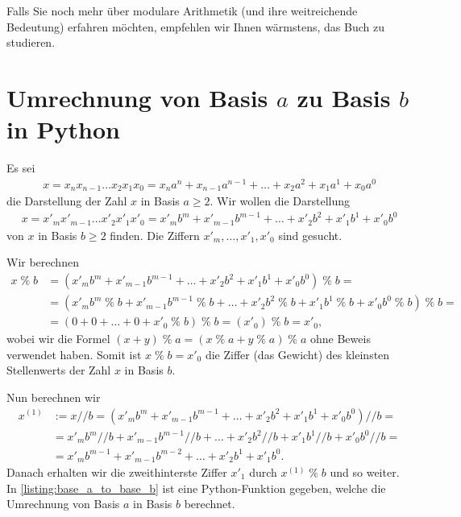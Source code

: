Falls Sie noch mehr über modulare Arithmetik (und ihre weitreichende Bedeutung) erfahren möchten, empfehlen wir Ihnen wärmstens, das Buch \cite{LearningModernAlgebra} zu studieren.


\section{Umrechnung von Basis \texorpdfstring{$a$}{a} zu Basis \texorpdfstring{$b$}{b} in Python}
Es sei
\begin{align*}
	x = x_nx_{n-1}\ldots x_2x_1x_0 = x_na^n + x_{n-1}a^{n-1} + \ldots + x_2a^2 + x_1a^1 + x_0a^0
\end{align*}
die Darstellung der Zahl $x$ in Basis $a\geq 2$. Wir wollen die Darstellung
\begin{align*}
	x = x'_mx'_{m-1}\ldots x'_2x'_1x'_0 = x'_mb^m + x'_{m-1}b^{m-1} + \ldots + x'_2b^2 + x'_1b^1 + x'_0b^0
\end{align*}
von $x$ in Basis $b\geq 2$ finden. Die  Ziffern $x'_m, \ldots, x'_1, x'_0$ sind gesucht.

Wir berechnen
\begin{align*}
	x\;\%\; b & = (x'_mb^m + x'_{m-1}b^{m-1} + \ldots + x'_2b^2 + x'_1b^1 + x'_0b^0) \;\%\; b =                                              \\
	          & = (x'_mb^m \;\%\; b + x'_{m-1}b^{m-1} \;\%\; b + \ldots + x'_2b^2 \;\%\; b + x'_1b^1 \;\%\; b + x'_0b^0 \;\%\; b) \;\%\; b = \\
	          & = (0 + 0 + \ldots + 0 + x'_0\;\%\;b)\;\%\; b = (x'_0)\;\%\; b = x'_0,
\end{align*}
wobei wir die Formel $(x + y) \;\%\; a = (x\;\%\; a + y\;\%\; a)\;\%\; a$ ohne Beweis verwendet haben. Somit ist $x\;\%\; b = x'_0$ die Ziffer (das Gewicht) des kleinsten Stellenwerts der Zahl $x$ in Basis $b$.

Nun berechnen wir
\begin{align*}
	x^{(1)} & := x // b =  (x'_mb^m + x'_{m-1}b^{m-1} + \ldots + x'_2b^2 + x'_1b^1 + x'_0b^0) // b =     \\
	        & = x'_mb^m // b + x'_{m-1}b^{m-1} // b+ \ldots + x'_2b^2 // b+ x'_1b^1 // b+ x'_0b^0 // b = \\
	        & = x'_mb^{m-1} + x'_{m-1}b^{m-2} + \ldots + x'_2b^1 + x'_1b^0.
\end{align*}
Danach erhalten wir die zweithinterste Ziffer $x'_1$ durch $x^{(1)}\;\%\; b$ und so weiter. In \cref{listing:base_a_to_base_b} ist eine Python-Funktion gegeben, welche die Umrechnung von Basis $a$ in Basis $b$ berechnet.
\clearpage

